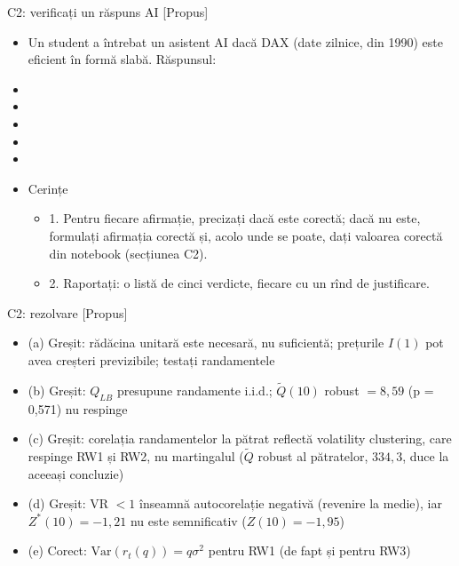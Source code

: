 \begin{frame}{C2: verificați un răspuns AI [Propus]}
\itemsize{\scriptsize}
\begin{itemize}
    \item Un student a întrebat un asistent AI dacă DAX (date zilnice, din 1990) este eficient în formă slabă. Răspunsul:
    \item {}
    \item {}
    \item {}
    \item {}
    \item {}
    \item Cerințe
    \begin{itemize}
        \item 1. Pentru fiecare afirmație, precizați dacă este corectă; dacă nu este, formulați afirmația corectă și, acolo unde se poate, dați valoarea corectă din notebook (secțiunea C2).
        \item 2. Raportați: o listă de cinci verdicte, fiecare cu un rînd de justificare.
    \end{itemize}
\end{itemize}
\end{frame}

\ifsolutions
\begin{frame}{C2: rezolvare [Propus]}
\itemsize{\footnotesize}
\begin{itemize}
    \item (a) Greșit: rădăcina unitară este necesară, nu suficientă; prețurile $I(1)$ pot avea creșteri previzibile; testați randamentele
    \item (b) Greșit: $Q_{LB}$ presupune randamente i.i.d.; $\tilde Q(10)$ robust $= 8{,}59$ (p = 0{,}571) nu respinge
    \item (c) Greșit: corelația randamentelor la pătrat reflectă volatility clustering, care respinge RW1 și RW2, nu martingalul ($\tilde Q$ robust al pătratelor, $334{,}3$, duce la aceeași concluzie)
    \item (d) Greșit: VR $< 1$ înseamnă autocorelație negativă (revenire la medie), iar $Z^*(10) = -1{,}21$ nu este semnificativ ($Z(10) = -1{,}95$)
    \item (e) Corect: $\mathrm{Var}(r_t(q)) = q\sigma^2$ pentru RW1 (de fapt și pentru RW3)
\end{itemize}
\end{frame}
\fi


